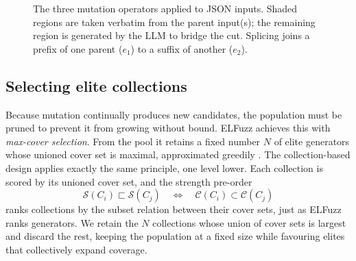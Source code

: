 \lilspace
\begin{figure}[h]
    \centering
    \caption{The three mutation operators applied to JSON inputs. Shaded regions are taken verbatim from the parent input(s); the remaining region is generated by the LLM to bridge the cut. Splicing joins a prefix of one parent ($e_1$) to a suffix of another ($e_2$).}
    \label{fig:mutation-examples}
\end{figure}

\subsection{Selecting elite collections}

Because mutation continually produces new candidates, the population must be pruned to prevent it from growing without bound. ELFuzz achieves this with \textit{max-cover selection}. From the pool it retains a fixed number $N$ of elite generators whose unioned cover set is maximal, approximated greedily \cite{chen_2025_elfuzz}. The collection-based design applies exactly the same principle, one level lower. Each collection is scored by its unioned cover set, and the strength pre-order
\[
    \mathcal{S}(C_i) \sqsubset \mathcal{S}(C_j) \quad\iff\quad \mathcal{C}(C_i) \subset \mathcal{C}(C_j)
\]
ranks collections by the subset relation between their cover sets, just as ELFuzz ranks generators. We retain the $N$ collections whose union of cover sets is largest and discard the rest, keeping the population at a fixed size while favouring elites that collectively expand coverage.


